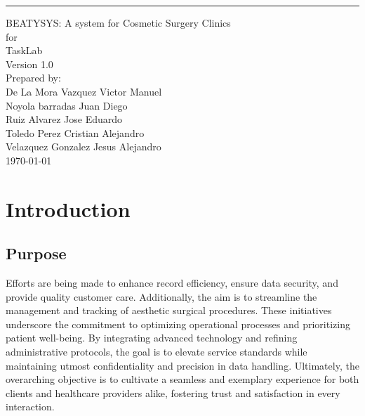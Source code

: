 \documentclass{scrreprt}
\date{}
\def\myversion{1.0}
\begin{document}
\begin{flushright}
    \rule{16cm}{5pt}\vskip1cm
    \begin{bfseries}
        \Huge{BEATYSYS: A system for Cosmetic Surgery Clinics}\\
        \vspace{1.5cm}
        for\\
        \vspace{1.5cm}
        TaskLab\\
        \vspace{1.5cm}
        \LARGE{Version \myversion}\\
        \vspace{1.5cm}
        Prepared by:\\ De La Mora Vazquez Victor Manuel \\ Noyola barradas Juan Diego \\ Ruiz Alvarez Jose Eduardo \\ Toledo Perez Cristian Alejandro \\ Velazquez Gonzalez Jesus Alejandro\\
        \vspace{1.5cm}
        \today\\
    \end{bfseries}
\end{flushright}

\tableofcontents

\chapter{Introduction}

\section{Purpose}
Efforts are being made to enhance record efficiency, ensure data security, and provide quality customer care. Additionally, the aim is to streamline the management and tracking of aesthetic surgical procedures. These initiatives underscore the commitment to optimizing operational processes and prioritizing patient well-being. By integrating advanced technology and refining administrative protocols, the goal is to elevate service standards while maintaining utmost confidentiality and precision in data handling. Ultimately, the overarching objective is to cultivate a seamless and exemplary experience for both clients and healthcare providers alike, fostering trust and satisfaction in every interaction.
\end{document}
